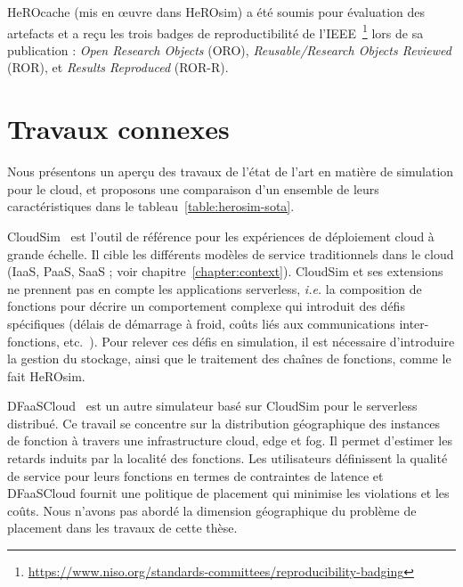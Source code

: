 HeROcache (mis en œuvre dans HeROsim) a été soumis pour évaluation des artefacts et a reçu les trois badges de reproductibilité de l'IEEE~\footnote{\href{https://www.niso.org/standards-committees/reproducibility-badging}{https://www.niso.org/standards-committees/reproducibility-badging}} lors de sa publication : \textit{Open Research Objects} (ORO), \textit{Reusable/Research Objects Reviewed} (ROR), et \textit{Results Reproduced} (ROR-R).

\section{Travaux connexes}
\label{section:herosim-sota}

Nous présentons un aperçu des travaux de l'état de l'art en matière de simulation pour le cloud, et proposons une comparaison d'un ensemble de leurs caractéristiques dans le tableau~\ref{table:herosim-sota}.

CloudSim~\cite{calheiros_cloudsim_2011} est l'outil de référence pour les expériences de déploiement cloud à grande échelle. Il cible les différents modèles de service traditionnels dans le cloud (\gls{IaaS}, \gls{PaaS}, \gls{SaaS} ; voir chapitre~\ref{chapter:context}).
CloudSim et ses extensions~\cite{calheiros_cloudsim_2011, mampage_cloudsimsc_2023, wickremasinghe_cloudanalyst_2010, jeonCloudSimExtensionSimulatingDistributed2019} ne prennent pas en compte les applications serverless, \textit{i.e.} la composition de fonctions pour décrire un comportement complexe qui introduit des défis spécifiques (délais de démarrage à froid, coûts liés aux communications inter-fonctions, etc.~\cite{wawrzoniakBoxerDataAnalytics2021a}).
Pour relever ces défis en simulation, il est nécessaire d'introduire la gestion du stockage, ainsi que le traitement des chaînes de fonctions, comme le fait HeROsim.

DFaaSCloud~\cite{jeonCloudSimExtensionSimulatingDistributed2019} est un autre simulateur basé sur CloudSim pour le serverless distribué. Ce travail se concentre sur la distribution géographique des instances de fonction à travers une infrastructure cloud, edge et fog. Il permet d'estimer les retards induits par la localité des fonctions. Les utilisateurs définissent la qualité de service pour leurs fonctions en termes de contraintes de latence et DFaaSCloud fournit une politique de placement qui minimise les violations et les coûts. Nous n'avons pas abordé la dimension géographique du problème de placement dans les travaux de cette thèse.

